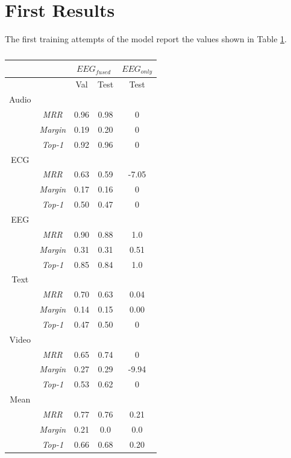 

\section{First Results}
The first training attempts of the model report the values shown in Table \ref{tab:metrics}.

\begin{table}
    \centering
    \begin{tabular}{c c | c | c ||  c}
        & & \multicolumn{2}{c}{$EEG_{fused}$} & {$EEG_{only}$} \\ \hline
        &                 & Val  & Test & Test  \\ \hline
        Audio &                 &      &      &       \\
        & \textit{MRR}    & 0.96 & 0.98 & 0     \\
        & \textit{Margin} & 0.19 & 0.20 & 0     \\
        & \textit{Top-1}  & 0.92 & 0.96 & 0     \\ \hline
        ECG   &                 &      &      &       \\
        & \textit{MRR}    & 0.63 & 0.59 & -7.05 \\
        & \textit{Margin} & 0.17 & 0.16 & 0     \\
        & \textit{Top-1}  & 0.50 & 0.47 & 0     \\ \hline
        EEG   &                 &      &      &       \\
        & \textit{MRR}    & 0.90 & 0.88 & 1.0   \\
        & \textit{Margin} & 0.31 & 0.31 & 0.51  \\
        & \textit{Top-1}  & 0.85 & 0.84 & 1.0   \\ \hline
        Text  &                 &      &      &       \\
        & \textit{MRR}    & 0.70 & 0.63 & 0.04  \\
        & \textit{Margin} & 0.14 & 0.15 & 0.00  \\
        & \textit{Top-1}  & 0.47 & 0.50 & 0     \\ \hline
        Video &                 &      &      &       \\
        & \textit{MRR}    & 0.65 & 0.74 & 0     \\
        & \textit{Margin} & 0.27 & 0.29 & -9.94 \\
        & \textit{Top-1}  & 0.53 & 0.62 & 0     \\ \hline
        Mean  &                 &      &      &       \\
        & \textit{MRR}    & 0.77 & 0.76 & 0.21  \\
        & \textit{Margin} & 0.21 & 0.0  & 0.0   \\
        & \textit{Top-1}  & 0.66 & 0.68 & 0.20  \\ \hline
    \end{tabular}

    \caption{}
    \label{tab:metrics}
\end{table}


